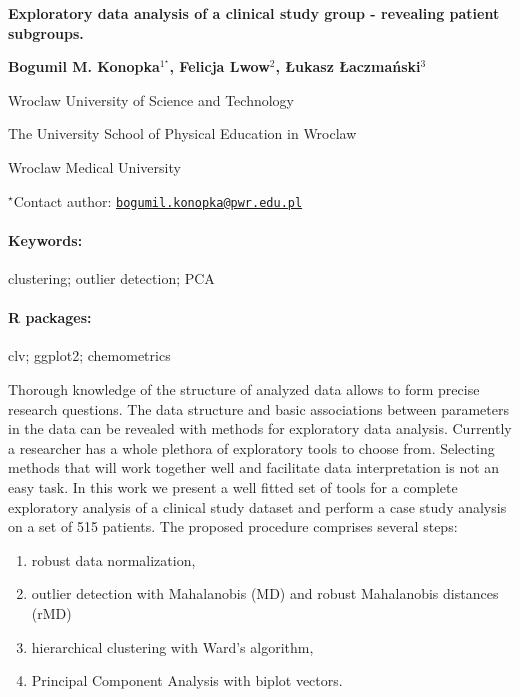 \documentclass[11pt, a4paper]{article}
\renewcommand{\title}[1]{\begin{center}{\bf \LARGE #1}\end{center}}
\newcommand{\keywords}{\paragraph{Keywords:}}
\newcommand{\packages}{\paragraph{R packages:}}
\providecommand{\tightlist}{%
  \setlength{\itemsep}{0pt}\setlength{\parskip}{0pt}}
\begin{document}
\pagestyle{empty}

\title{Exploratory data analysis of a clinical study group - revealing patient
subgroups.}

\begin{center}
  {\bf Bogumil M. Konopka$^{1^\star}$, Felicja Lwow$^{2}$, Łukasz Łaczmański$^{3}$}
\end{center}

\vskip 0.3cm

\begin{affiliations}
\begin{enumerate}
\begin{minipage}{0.915\textwidth}
\centering
\item Wroclaw University of Science and Technology \\[-2pt]
\item The University School of Physical Education in Wroclaw \\[-2pt]
\item Wroclaw Medical University \\[-2pt]
\end{minipage}
\end{enumerate}
$^\star$Contact author: \href{mailto:bogumil.konopka@pwr.edu.pl}{\nolinkurl{bogumil.konopka@pwr.edu.pl}}\\
\end{affiliations}

\vskip 0.5cm

\begin{minipage}{0.915\textwidth}
\keywords clustering; outlier detection; PCA
\packages clv; ggplot2; chemometrics
\end{minipage}

\vskip 0.8cm

Thorough knowledge of the structure of analyzed data allows to form
precise research questions. The data structure and basic associations
between parameters in the data can be revealed with methods for
exploratory data analysis. Currently a researcher has a whole plethora
of exploratory tools to choose from. Selecting methods that will work
together well and facilitate data interpretation is not an easy task. In
this work we present a well fitted set of tools for a complete
exploratory analysis of a clinical study dataset and perform a case
study analysis on a set of 515 patients. The proposed procedure
comprises several steps:

\begin{enumerate}
\def\labelenumi{\arabic{enumi}.}
\tightlist
\item
  robust data normalization,
\item
  outlier detection with Mahalanobis (MD) and robust Mahalanobis
  distances (rMD)
\item
  hierarchical clustering with Ward's algorithm,
\item
  Principal Component Analysis with biplot vectors.
\end{enumerate}
\end{document}
